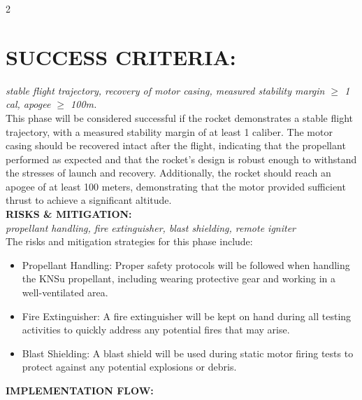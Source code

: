 \documentclass[10pt]{report}
\begin{document}
\begin{multicols}{2}
  \section*{SUCCESS CRITERIA:}  \textit{stable flight trajectory, recovery of motor casing, measured stability margin $\geq$ 1 cal, apogee $\geq$ 100m.} \\
  This phase will be considered successful if the rocket demonstrates a stable flight trajectory, with a measured stability margin of at least 1 caliber. The motor casing should be recovered intact after the flight, indicating that the propellant performed as expected and that the rocket's design is robust enough to withstand the stresses of launch and recovery. Additionally, the rocket should reach an apogee of at least 100 meters, demonstrating that the motor provided sufficient thrust to achieve a significant altitude. \\

  \noindent \textbf{\large RISKS \& MITIGATION:}\\  \textit{propellant handling, fire extinguisher, blast shielding, remote igniter} \\
  The risks and mitigation strategies for this phase include: \\
\begin{itemize}
\item Propellant Handling: Proper safety protocols will be followed when handling the KNSu propellant, including wearing protective gear and working in a well-ventilated area. \\
  \item Fire Extinguisher: A fire extinguisher will be kept on hand during all testing activities to quickly address any potential fires that may arise. \\
  \item Blast Shielding: A blast shield will be used during static motor firing tests to protect against any potential explosions or debris. \\
 
\end{itemize}

  \end{multicols}
\noindent \textbf{IMPLEMENTATION FLOW:} \\
\vspace{0.5cm}
\end{document}
